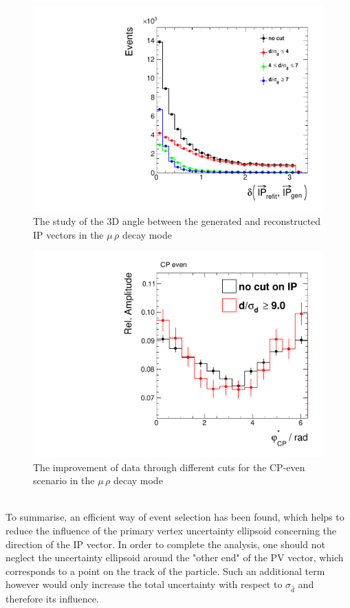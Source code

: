 \begin{figure}[h]
	\centering
	\includegraphics[width=0.7\linewidth]{Figures/deltaGenRecoIP1.pdf}
	\caption{The study of the 3D angle between the generated and reconstructed IP vectors in the $\mu \, \rho$ decay mode}
	\label{fig:lambdacuts_angles}
\end{figure}
\begin{figure}[h]
	\centering
	\includegraphics[width=0.7\linewidth]{Figures/recoPhiStarCPCombMerged_norefit_CPeven.pdf}
	\caption{The improvement of data through different cuts for the CP-even scenario in the $\mu \, \rho$ decay mode}
	\label{fig:lambdacuts_CP}
\end{figure}\\
To summarise, an efficient way of event selection has been found, which helps to reduce the influence of the primary vertex uncertainty ellipsoid concerning the direction of the IP vector. In order to complete the analysis, one should not neglect the uncertainty ellipsoid around the "other end" of the PV vector, which corresponds to a point on the track of the particle. Such an additional term however would only increase the total uncertainty with respect to $\sigma_{\hat{d}}$ and therefore its influence.